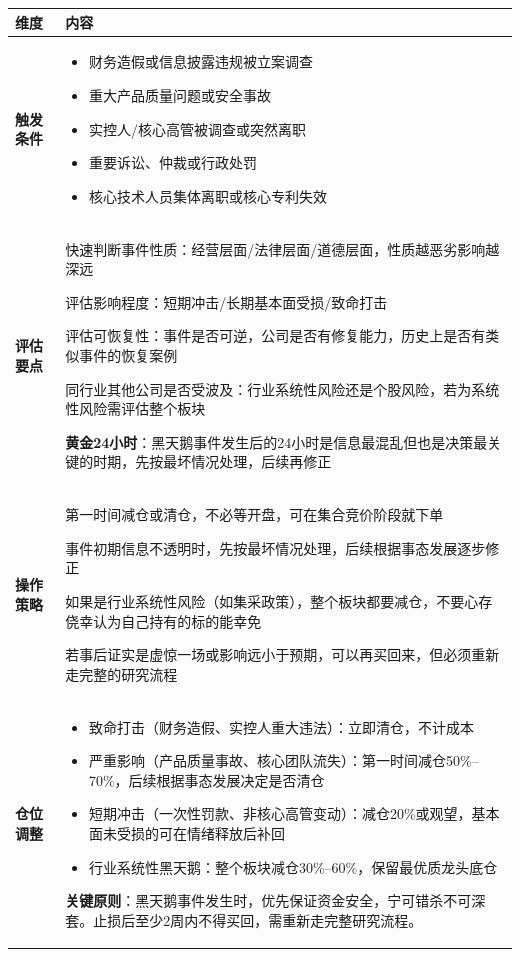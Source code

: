 \begin{exhibitbox}[表9-21：个股黑天鹅事件调仓指南]
\scriptsize
\setlength{\tabcolsep}{3pt}
\renewcommand{\arraystretch}{1.12}
\begin{tabularx}{\textwidth}{l X}
\toprule
\textbf{维度} & \textbf{内容} \\
\midrule
\textbf{触发条件} & 
\begin{itemize}[leftmargin=1.2em]
\item 财务造假或信息披露违规被立案调查
\item 重大产品质量问题或安全事故
\item 实控人/核心高管被调查或突然离职
\item 重要诉讼、仲裁或行政处罚
\item 核心技术人员集体离职或核心专利失效
\end{itemize}
\\
\midrule
\textbf{评估要点} & 
快速判断事件性质：经营层面/法律层面/道德层面，性质越恶劣影响越深远

评估影响程度：短期冲击/长期基本面受损/致命打击

评估可恢复性：事件是否可逆，公司是否有修复能力，历史上是否有类似事件的恢复案例

同行业其他公司是否受波及：行业系统性风险还是个股风险，若为系统性风险需评估整个板块

\textbf{黄金24小时}：黑天鹅事件发生后的24小时是信息最混乱但也是决策最关键的时期，先按最坏情况处理，后续再修正
\\
\midrule
\textbf{操作策略} & 
第一时间减仓或清仓，不必等开盘，可在集合竞价阶段就下单

事件初期信息不透明时，先按最坏情况处理，后续根据事态发展逐步修正

如果是行业系统性风险（如集采政策），整个板块都要减仓，不要心存侥幸认为自己持有的标的能幸免

若事后证实是虚惊一场或影响远小于预期，可以再买回来，但必须重新走完整的研究流程
\\
\midrule
\textbf{仓位调整} & 
\begin{itemize}[leftmargin=1.2em]
\item 致命打击（财务造假、实控人重大违法）：立即清仓，不计成本
\item 严重影响（产品质量事故、核心团队流失）：第一时间减仓50\%--70\%，后续根据事态发展决定是否清仓
\item 短期冲击（一次性罚款、非核心高管变动）：减仓20\%或观望，基本面未受损的可在情绪释放后补回
\item 行业系统性黑天鹅：整个板块减仓30\%--60\%，保留最优质龙头底仓
\end{itemize}
\vspace{0.3em}
\textbf{关键原则}：黑天鹅事件发生时，优先保证资金安全，宁可错杀不可深套。止损后至少2周内不得买回，需重新走完整研究流程。
\\
\bottomrule
\end{tabularx}
\vspace{0.2cm}


\end{exhibitbox}
